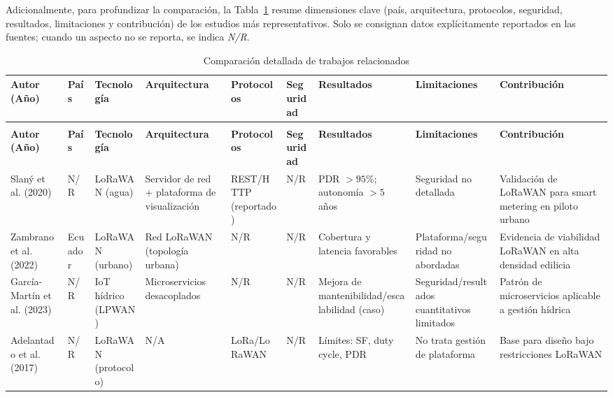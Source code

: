 \documentclass[12pt,a4paper,oneside]{report}
\begin{document}
Adicionalmente, para profundizar la comparación, la Tabla~\ref{tab:comparativa-detallada} resume dimensiones clave (país, arquitectura, protocolos, seguridad, resultados, limitaciones y contribución) de los estudios más representativos. Solo se consignan datos explícitamente reportados en las fuentes; cuando un aspecto no se reporta, se indica \textit{N/R}.

\begin{longtable}{>{\raggedright\arraybackslash}p{2.8cm} >{\raggedright\arraybackslash}p{1.8cm} >{\raggedright\arraybackslash}p{2.3cm} >{\raggedright\arraybackslash}p{2.6cm} >{\raggedright\arraybackslash}p{2.2cm} >{\raggedright\arraybackslash}p{2.0cm} >{\raggedright\arraybackslash}p{2.8cm} >{\raggedright\arraybackslash}p{2.8cm} >{\raggedright\arraybackslash}p{2.8cm}}
\caption{Comparación detallada de trabajos relacionados}\label{tab:comparativa-detallada} \\
\toprule
\textbf{Autor (Año)} & \textbf{País} & \textbf{Tecnología} & \textbf{Arquitectura} & \textbf{Protocolos} & \textbf{Seguridad} & \textbf{Resultados} & \textbf{Limitaciones} & \textbf{Contribución} \\
\midrule
\endfirsthead
\multicolumn{9}{c}{\textit{(Continuación Tabla~\ref{tab:comparativa-detallada})}} \\
\toprule
\textbf{Autor (Año)} & \textbf{País} & \textbf{Tecnología} & \textbf{Arquitectura} & \textbf{Protocolos} & \textbf{Seguridad} & \textbf{Resultados} & \textbf{Limitaciones} & \textbf{Contribución} \\
\midrule
\endhead
Slaný et al. (2020) & N/R & LoRaWAN (agua) & Servidor de red + plataforma de visualización & REST/HTTP (reportado) & N/R & PDR $>95\%$; autonomía $>5$ años & Seguridad no detallada & Validación de LoRaWAN para smart metering en piloto urbano \\
Zambrano et al. (2022) & Ecuador & LoRaWAN (urbano) & Red LoRaWAN (topología urbana) & N/R & N/R & Cobertura y latencia favorables & Plataforma/seguridad no abordadas & Evidencia de viabilidad LoRaWAN en alta densidad edilicia \\
García-Martín et al. (2023) & N/R & IoT hídrico (LPWAN) & Microservicios desacoplados & N/R & N/R & Mejora de mantenibilidad/escalabilidad (caso) & Seguridad/resultados cuantitativos limitados & Patrón de microservicios aplicable a gestión hídrica \\
Adelantado et al. (2017) & N/R & LoRaWAN (protocolo) & N/A & LoRa/LoRaWAN & N/R & Límites: SF, duty cycle, PDR & No trata gestión de plataforma & Base para diseño bajo restricciones LoRaWAN \\

\end{longtable}
\end{document}
